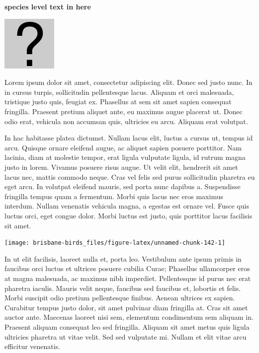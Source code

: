 \documentclass[]{book}
\let\origfigure\figure
\let\endorigfigure\endfigure
\renewenvironment{figure}[1][2] {
  \expandafter\origfigure\expandafter[H]
} {
  \endorigfigure
}
\begin{document}
\textbf{species level text in here}

\begin{figure}
\centering
\includegraphics{assets/missing.png}
\caption{No image for species}
\end{figure}

Lorem ipsum dolor sit amet, consectetur adipiscing elit. Donec sed justo
nunc. In in cursus turpis, sollicitudin pellentesque lacus. Aliquam et
orci malesuada, tristique justo quis, feugiat ex. Phasellus at sem sit
amet sapien consequat fringilla. Praesent pretium aliquet ante, eu
maximus augue placerat ut. Donec odio erat, vehicula non accumsan quis,
ultricies eu arcu. Aliquam erat volutpat.

In hac habitasse platea dictumst. Nullam lacus elit, luctus a cursus ut,
tempus id arcu. Quisque ornare eleifend augue, ac aliquet sapien posuere
porttitor. Nam lacinia, diam at molestie tempor, erat ligula vulputate
ligula, id rutrum magna justo in lorem. Vivamus posuere risus augue. Ut
velit elit, hendrerit sit amet lacus nec, mattis commodo neque. Cras vel
felis sed purus sollicitudin pharetra eu eget arcu. In volutpat eleifend
mauris, sed porta nunc dapibus a. Suspendisse fringilla tempus quam a
fermentum. Morbi quis lacus nec eros maximus interdum. Nullam venenatis
vehicula magna, a egestas est ornare vel. Fusce quis luctus orci, eget
congue dolor. Morbi luctus est justo, quis porttitor lacus facilisis sit
amet.

\begin{figure}
\texttt{[image: brisbane-birds\_files/figure-latex/unnamed-chunk-142-1]} \caption{insert figure caption}\label{fig:unnamed-chunk-142}
\end{figure}

In ut elit facilisis, laoreet nulla et, porta leo. Vestibulum ante ipsum
primis in faucibus orci luctus et ultrices posuere cubilia Curae;
Phasellus ullamcorper eros at magna malesuada, ac maximus nibh
imperdiet. Pellentesque id purus nec erat pharetra iaculis. Mauris velit
neque, faucibus sed faucibus et, lobortis et felis. Morbi suscipit odio
pretium pellentesque finibus. Aenean ultrices ex sapien. Curabitur
tempus justo dolor, sit amet pulvinar diam fringilla at. Cras sit amet
auctor ante. Maecenas laoreet nisi sem, elementum condimentum sem
aliquam in. Praesent aliquam consequat leo sed fringilla. Aliquam sit
amet metus quis ligula ultricies pharetra ut vitae velit. Sed sed
vulputate mi. Nullam et elit vitae arcu efficitur venenatis.
\end{document}
